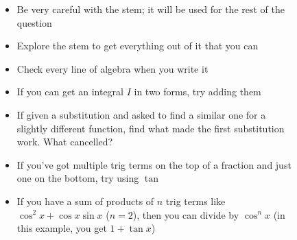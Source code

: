 \documentclass[../main.tex]{subfile}
\begin{document}

\begin{figure}[h]
\centering
\begin{minipage}{0.85\linewidth}


\begin{itemize}
	\item Be very careful with the stem; it will be used for the rest of the question
	\item Explore the stem to get everything out of it that you can
	\item Check every line of algebra when you write it
\end{itemize}


\begin{itemize}
	\item If you can get an integral $I$ in two forms, try adding them
	\item If given a substitution and asked to find a similar one for a slightly different function, find what made the first substitution work. What cancelled?
\end{itemize}


\begin{itemize}
	\item If you've got multiple trig terms on the top of a fraction and just one on the bottom, try using $\tan$
	\item If you have a sum of products of $n$ trig terms like $\cos^2 x + \cos x\sin x$ ($n = 2$), then you can divide by $\cos^n x$ (in this example, you get $1 + \tan x$)
\end{itemize}

\end{minipage}
\end{figure}
\end{document}
